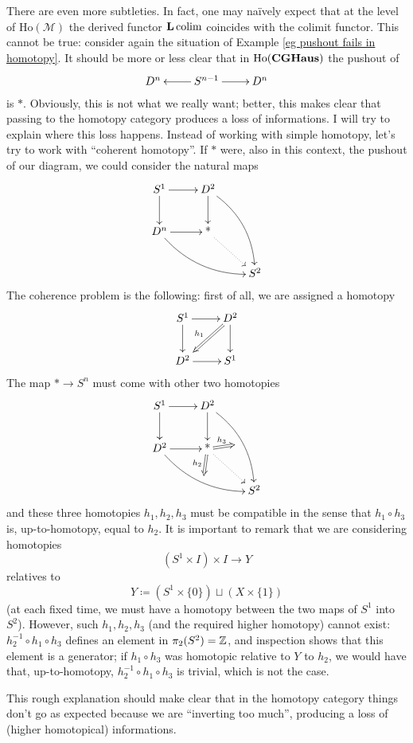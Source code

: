 \begin{refsection}
\begin{rmk}
There are even more subtleties. In fact, one may na\"ively expect that at the level of $\mathrm{Ho}(\mathcal M)$ the derived functor $\mathbf L \operatorname*{colim}$ coincides with the colimit functor. This cannot be true: consider again the situation of Example \ref{eg pushout fails in homotopy}. It should be more or less clear that in $\mathrm{Ho}(\mathbf{CGHaus})$ the pushout of
\[
\xymatrix{
D^n & S^{n-1} \ar[l] \ar[r] & D^n
}
\]
is $*$. Obviously, this is not what we really want; better, this makes clear that passing to the homotopy category produces a loss of informations. I will try to explain where this loss happens. Instead of working with simple homotopy, let's try to work with ``coherent homotopy''. If $*$ were, also in this context, the pushout of our diagram, we could consider the natural maps
\[
\xymatrix{
S^1 \ar[d] \ar[r] & D^2 \ar@/^1pc/[ddr] \ar[d] \\ D^n \ar[r] \ar@/_1pc/[drr] & \text{*} \ar@{.>}[dr] \\ & & S^2
}
\]
The coherence problem is the following: first of all, we are assigned a homotopy
\[
\xymatrix{
S^1 \ar[d] \ar[r] & D^2 \ar[d] \ar@{=>}[dl]_{h_1} \\ D^2 \ar[r] & S^1
}
\]
The map $* \to S^n$ must come with other two homotopies
\[
\xymatrix{
S^1 \ar[d] \ar[r] & D^2 \ar@/^1pc/[ddr]_{\hspace{1pt}}="a" \ar[d] \\ D^2 \ar[r] \ar@/_1pc/[drr]^{\hspace{1pt}}="b" & \text{*} \ar@{.>}[dr] \ar@{=>}{};"a" ^{h_3} \ar@{=>}{};"b" _{h_2} \\ & & S^2
}
\]
and these three homotopies $h_1,h_2,h_3$ must be compatible in the sense that $h_1 \circ h_3$ is, up-to-homotopy, equal to $h_2$. It is important to remark that we are considering homotopies
\[
(S^1 \times I) \times I \to Y
\]
relatives to
\[
Y\coloneqq (S^1 \times \{0\}) \sqcup (X \times \{1\})
\]
(at each fixed time, we must have a homotopy between the two maps of $S^1$ into $S^2$). However, such $h_1,h_2,h_3$ (and the required higher homotopy) cannot exist: $h_2^{-1} \circ h_1 \circ h_3$ defines an element in $\pi_2(S^2) = \mathbb{Z}$, and inspection shows that this element is a generator; if $h_1 \circ h_3$ was homotopic relative to $Y$ to $h_2$, we would have that, up-to-homotopy, $h_2^{-1} \circ h_1 \circ h_3$ is trivial, which is not the case.

This rough explanation should make clear that in the homotopy category things don't go as expected because we are ``inverting too much'', producing a loss of (higher homotopical) informations.
\end{rmk}


\end{refsection}
